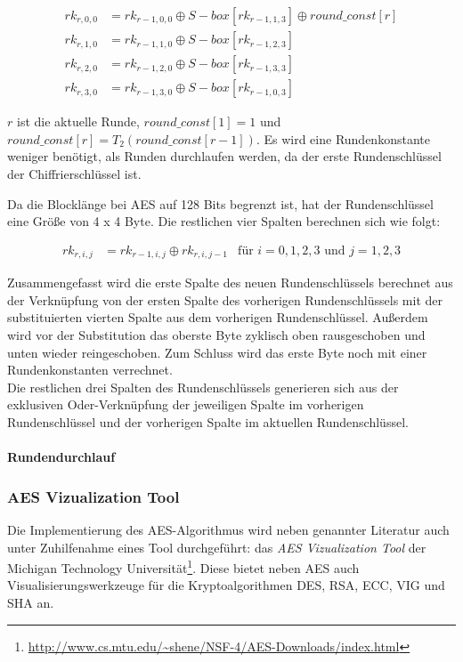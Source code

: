     \begin{equation*}
     \begin{aligned}
     rk_{r,0,0} &= rk_{r-1,0,0} \oplus S-box[rk_{r-1,1,3}] \oplus round\_const[r] \\
     rk_{r,1,0} &= rk_{r-1,1,0} \oplus S-box[rk_{r-1,2,3}] \\
     rk_{r,2,0} &= rk_{r-1,2,0} \oplus S-box[rk_{r-1,3,3}] \\
     rk_{r,3,0} &= rk_{r-1,3,0} \oplus S-box[rk_{r-1,0,3}]
     \end{aligned}
    \end{equation*}
    
   $r$ ist die aktuelle Runde, $round\_const[1] = 1$ und $round\_const[r] = T_2(round\_const[r-1])$. Es wird eine
   Rundenkonstante weniger benötigt, als Runden durchlaufen werden, da der erste Rundenschlüssel der 
   Chiffrierschlüssel ist.
   
   Da die Blocklänge bei AES auf 128 Bits begrenzt ist, hat der Rundenschlüssel eine Größe von 4 x 4 Byte. Die
   restlichen vier Spalten berechnen sich wie folgt:
   
    \begin{equation*}
     \begin{aligned}
      rk_{r,i,j} &= rk_{r-1,i,j} \oplus rk_{r,i,j-1} &\text{für $i = 0, 1, 2, 3$ und $j = 1, 2, 3$}
     \end{aligned}
    \end{equation*}
    
   Zusammengefasst wird die erste Spalte des neuen Rundenschlüssels berechnet aus der Verknüpfung
   von der ersten Spalte des vorherigen Rundenschlüssels mit der substituierten vierten Spalte aus dem vorherigen
   Rundenschlüssel. Außerdem wird vor der Substitution das oberste Byte zyklisch oben rausgeschoben und unten
   wieder reingeschoben. Zum Schluss wird das erste Byte noch mit einer Rundenkonstanten verrechnet. \\
   Die restlichen drei Spalten des Rundenschlüssels generieren sich aus der exklusiven Oder-Verknüpfung der
   jeweiligen Spalte im vorherigen Rundenschlüssel und der vorherigen Spalte im aktuellen Rundenschlüssel.

  \paragraph{Rundendurchlauf}
  
  
   \subsubsection{AES Vizualization Tool}
   \label{subsubsec:aesviz}
   Die Implementierung des AES-Algorithmus wird neben genannter Literatur auch unter
   Zuhilfenahme eines Tool durchgeführt: das \textit{AES Vizualization Tool} der Michigan
   Technology Universität\footnote{\url{http://www.cs.mtu.edu/~shene/NSF-4/AES-Downloads/index.html}}.
   Diese bietet neben AES auch Visualisierungswerkzeuge für die Kryptoalgorithmen DES, RSA, ECC, VIG
   und SHA an.

